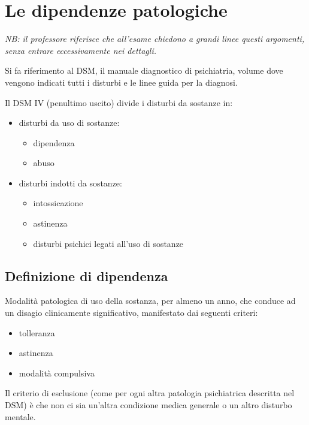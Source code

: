 \section{Le dipendenze patologiche}

\textit{NB: il professore riferisce che all'esame chiedono a grandi linee questi argomenti, senza entrare eccessivamente nei dettagli.}

Si fa riferimento al DSM, il manuale diagnostico di psichiatria, volume dove vengono indicati tutti i disturbi e le linee guida per la diagnosi.

Il DSM IV (penultimo uscito) divide i disturbi da sostanze in:

\begin{itemize}
\item
  disturbi da uso di sostanze:
  \begin{itemize}
  \item
    dipendenza
  \item
    abuso
  \end{itemize}
\item
  disturbi indotti da sostanze:
  \begin{itemize}
  \item
    intossicazione
  \item
    astinenza
  \item
    disturbi psichici legati all'uso di sostanze
  \end{itemize}
\end{itemize}

\subsection{Definizione di dipendenza}

Modalità patologica di uso della sostanza, per almeno un anno, che
conduce ad un disagio clinicamente significativo, manifestato dai
seguenti criteri:

\begin{itemize}
\item
  tolleranza
\item
  astinenza
\item
  modalità compulsiva
\end{itemize}

Il criterio di esclusione (come per ogni altra patologia psichiatrica
descritta nel DSM) è che non ci sia un'altra condizione medica generale
o un altro disturbo mentale.

